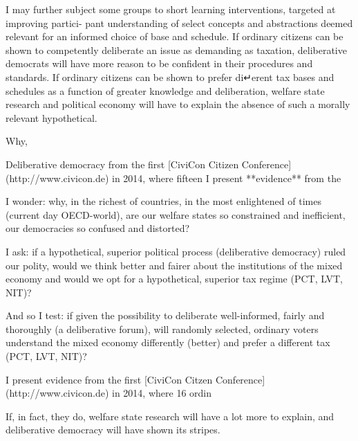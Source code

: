 I may further subject some groups to short learning interventions, targeted at improving partici- pant understanding of select concepts and abstractions deemed relevant for an informed choice of base and schedule.
If ordinary citizens can be shown to competently deliberate an issue as demanding as taxation, deliberative democrats will have more reason to be confident in their procedures and standards.
If ordinary citizens can be shown to prefer di↵erent tax bases and schedules as a function of greater knowledge and deliberation, welfare state research and political economy will have to explain the absence of such a morally relevant hypothetical.

Why,

Deliberative democracy from the first [CiviCon Citizen Conference](http://www.civicon.de) in 2014, where fifteen
I present **evidence** from the

I wonder:
why, in the richest of countries, in the most enlightened of times (current day OECD-world), are our welfare states so constrained and inefficient, our democracies so confused and distorted?

I ask:
if a hypothetical, superior political process (deliberative democracy) ruled our polity, would we think better and fairer about the institutions of the mixed economy and would we opt for a hypothetical, superior tax regime (PCT, LVT, NIT)?

And so I test:
if given the possibility to deliberate well-informed, fairly and thoroughly (a deliberative forum), will randomly selected, ordinary voters understand the mixed economy differently (better) and prefer a different tax (PCT, LVT, NIT)?

I present evidence from the first [CiviCon Citzen Conference](http://www.civicon.de) in 2014, where 16 ordin

If, in fact, they do, welfare state research will have a lot more to explain, and deliberative democracy will have shown its stripes.
